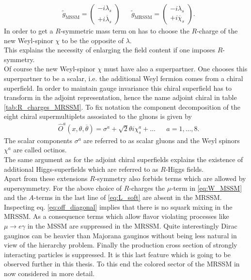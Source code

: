 \begin{align}
& \tilde{g}_\mathrm{MSSM} = \begin{pmatrix}
-i \lambda_s \\
+i \overline{\lambda}_s
\end{pmatrix} && \tilde{g}_\mathrm{MRSSM} = \begin{pmatrix}
-i \lambda_s \\
+i \overline{\chi}_s
\end{pmatrix}.
\end{align}
In order to get a $R$-symmetric mass term on has to choose the $R$-charge of the new Weyl-spinor $\chi$ to be the opposite of $\lambda$.\\
This explains the necessity of enlarging the field content if one imposes $R$-symmetry.\\
Of course the new Weyl-spinor $\chi$ must have also a superpartner. One chooses this superpartner to be a scalar, i.e. the additional Weyl fermion comes from a chiral superfield. In order to maintain gauge invariance this chiral superfield has to transform in the adjoint representation, hence the name adjoint chiral in table \ref{tab:R_charges_MRSSM}. To fix notation the component decomposition of the eight chiral supermultiplets assosiated to the gluons is given by
\begin{align}
&\hat{O}^a(x, \theta, \overline{\theta}) = \sigma^a + \sqrt{2}\theta i\chi^a_s + \hdots && a = 1,\hdots,8.
\end{align}
The scalar components $\sigma^a$ are referred to as scalar gluons and the Weyl spinors $\chi^a$ are called octinos.\\
The same argument as for the adjoint chiral superfields explains the existence of additional Higgs-superfields which are referred to as $R$-Higgs fields.\\
Apart from these extensions $R$-symmetry also forbids terms which are allowed by supersymmetry. For the above choice of $R$-charges the $\mu$-term in \eqref{eq:W_MSSM} and the $A$-terms in the last line of \eqref{eq:L_soft} are absent in the MRSSM. Inspecting eq. \eqref{eq:off_diagonal} implies that there is no squark mixing in the MRSSM. As a consequence terms which allow flavor violating processes like $\mu \to e \gamma$ in the MSSM are suppressed in the MRSSM\cite{Kribs:2007ac}. Quite interestingly Dirac gauginos can be heavier than Majorana gauginos without being less natural in view of the hierarchy problem\cite{Nelson:2002ca, Kribs:2012gx, Hardy:2013ywa}. Finally the production cross section of strongly interacting particles is suppressed\cite{Kribs:2012gx, Kribs:2013oda}. It is this last feature which is going to be observed further in this thesis. To this end the colored sector of the MRSSM in now considered in more detail.


